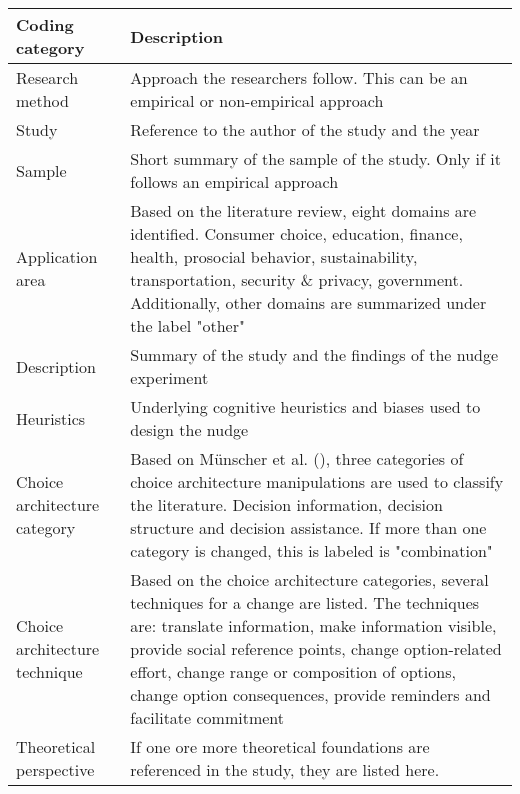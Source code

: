 \newpage


\begin{table}[h!]
\small
\centering
\begin{tabular}{|p{}|p{}|}
\hline
\textbf{Coding category} & \textbf{Description} \\ \hline
Research method & Approach the researchers follow. This can be an empirical or non-empirical approach \\ \hline
Study & Reference to the author of the study and the year \\ \hline
Sample & Short summary of the sample of the study. Only if it follows an empirical approach \\ \hline
Application area & Based on the literature review, eight domains are identified. Consumer choice, education, finance, health, prosocial behavior, sustainability, transportation, security \& privacy, government. Additionally, other domains are summarized under the label "other" \\ \hline
Description & Summary of the study and the findings of the nudge experiment \\ \hline
Heuristics & Underlying cognitive heuristics and biases used to design the nudge \\ \hline
Choice architecture category & Based on Münscher et al. (\citeyear{munscher_review_2016}), three categories of choice architecture manipulations are used to classify the literature. Decision information, decision structure and decision assistance. If more than one category is changed, this is labeled is "combination" \\ \hline
Choice architecture technique & Based on the choice architecture categories, several techniques for a change are listed. The techniques are: translate information, make information visible, provide social reference points, change option-related effort, change range or composition of options, change option consequences, provide reminders and facilitate commitment \\ \hline
Theoretical perspective & If one ore more theoretical foundations are referenced in the study, they are listed here. \\ \hline

\end{tabular}

\end{table}
